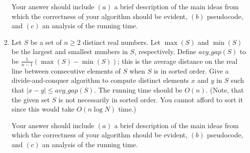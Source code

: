 \documentclass[a4paper]{article}
\begin{document}
\begin{enumerate}
    Your answer should include $(a)$ a brief description of the main ideas from which the correctness of your algorithm should be evident, $(b)$
    pseudocode, and $(c)$ an analysis of the running time.

  \item Let $S$ be a set of $n \geq 2$ distinct real numbers. Let $\max(S)$ and $\min(S)$ be the largest and smallest numbers in $S$, respectively.
    Define $avg\_gap(S)$ to be $\frac{1}{n-1} (\max(S) - \min(S))$; this is the average distance on the real line between consecutive elements of $S$
    when $S$ is in sorted order. Give a divide-and-conquer algorithm to compute distinct elements $x$ and $y$ in $S$ such that $|x-y| \leq
    avg\_gap(S)$. The running time should be $O(n)$. (Note, that the given set $S$ is not necessarily in sorted order. You cannot afford to sort it
    since this would take $O(n \log N)$ time.)

    Your answer should include $(a)$ a brief description of the main ideas from which the correctness of your algorithm should be evident, $(b)$
    pseudocode, and $(c)$ an analysis of the running time.
\end{enumerate}
\end{document}
